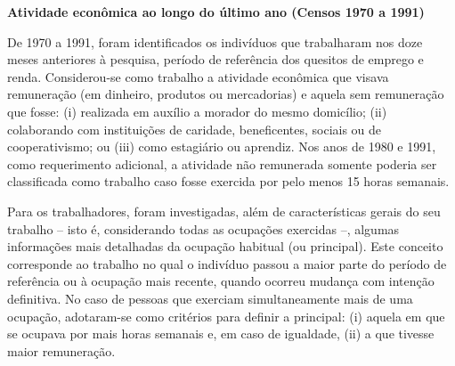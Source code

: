 \documentclass[12pt,a4paper]{article}
\begin{document}
\medskip
\textbf{Atividade econômica ao longo do último ano (Censos 1970 a 1991)}

De 1970 a 1991, foram identificados os indivíduos que trabalharam nos doze meses anteriores à pesquisa, período de referência dos quesitos de emprego e renda. Considerou-se como trabalho a atividade econômica que visava remuneração (em dinheiro, produtos ou mercadorias) e aquela sem remuneração que fosse: (i) realizada em auxílio a morador do mesmo domicílio; (ii) colaborando com instituições de caridade, beneficentes, sociais ou de cooperativismo; ou (iii) como estagiário ou aprendiz. Nos anos de 1980 e 1991, como requerimento adicional, a atividade não remunerada somente poderia ser classificada como trabalho caso fosse exercida por pelo menos 15 horas semanais.

Para os trabalhadores, foram investigadas, além de características gerais do seu trabalho -- isto é, considerando todas as ocupações exercidas --, algumas informações mais detalhadas da ocupação habitual (ou principal). Este conceito corresponde ao trabalho no qual o indivíduo passou a maior parte do período de referência ou à ocupação mais recente, quando ocorreu mudança com intenção definitiva. No caso de pessoas que exerciam simultaneamente mais de uma ocupação, adotaram-se como critérios para definir a principal: (i) aquela em que se ocupava por mais horas semanais e, em caso de igualdade, (ii) a que tivesse maior remuneração.
\end{document}
